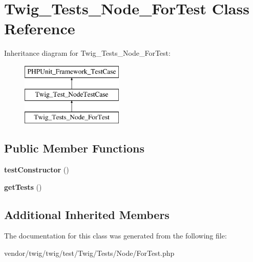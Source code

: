\hypertarget{classTwig__Tests__Node__ForTest}{}\section{Twig\+\_\+\+Tests\+\_\+\+Node\+\_\+\+For\+Test Class Reference}
\label{classTwig__Tests__Node__ForTest}
Inheritance diagram for Twig\+\_\+\+Tests\+\_\+\+Node\+\_\+\+For\+Test\+:\begin{figure}[H]
\begin{center}
\leavevmode
\includegraphics[height=3.000000cm]{classTwig__Tests__Node__ForTest}
\end{center}
\end{figure}
\subsection*{Public Member Functions}
\begin{DoxyCompactItemize}
\item 
{\bfseries test\+Constructor} ()\hypertarget{classTwig__Tests__Node__ForTest_a6eec6bf14c1dfb84897dea6e40fbd84b}{}\label{classTwig__Tests__Node__ForTest_a6eec6bf14c1dfb84897dea6e40fbd84b}

\item 
{\bfseries get\+Tests} ()\hypertarget{classTwig__Tests__Node__ForTest_a5c5cdc15ec652a520721665d0349797a}{}\label{classTwig__Tests__Node__ForTest_a5c5cdc15ec652a520721665d0349797a}

\end{DoxyCompactItemize}
\subsection*{Additional Inherited Members}


The documentation for this class was generated from the following file\+:\begin{DoxyCompactItemize}
\item 
vendor/twig/twig/test/\+Twig/\+Tests/\+Node/For\+Test.\+php\end{DoxyCompactItemize}
